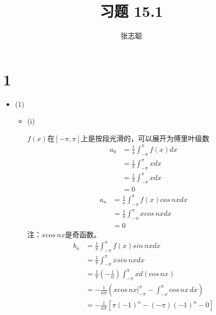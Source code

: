 \documentclass{article}
\begin{document}
\title{习题 15.1}
\author{张志聪}
\maketitle

\section*{1}
\begin{itemize}
  \item (1)

        \begin{itemize}
          \item (i)

                $f(x)$在$[-\pi, \pi]$上是按段光滑的，可以展开为傅里叶级数
                \begin{align*}
                  a_0
                   & = \frac{1}{\pi} \int_{-\pi}^{\pi} f(x) dx \\
                   & = \frac{1}{\pi} \int_{-\pi}^{\pi} x dx    \\
                   & = \frac{1}{\pi} \int_{-\pi}^{\pi} x dx    \\
                   & = 0
                \end{align*}
                \begin{align*}
                  a_n
                   & = \frac{1}{\pi} \int_{-\pi}^{\pi} f(x) cos\, nx dx \\
                   & = \frac{1}{\pi} \int_{-\pi}^{\pi} x cos\, nx dx    \\
                   & = 0
                \end{align*}
                注：$x cos\, nx$是奇函数。
                \begin{align*}
                  b_n
                   & = \frac{1}{\pi} \int_{-\pi}^{\pi} f(x) sin\, nx dx                                   \\
                   & = \frac{1}{\pi} \int_{-\pi}^{\pi} x sin\, nx dx                                      \\
                   & = \frac{1}{\pi} (-\frac{1}{n})\int_{-\pi}^{\pi} x d(cos\, nx)                        \\
                   & = -\frac{1}{n\pi}(x cos\, nx \bigg|_{-\pi}^{\pi} - \int_{-\pi}^{\pi} cos\, nx \, dx) \\
                   & = -\frac{1}{n\pi}[\pi(-1)^n - (-\pi)(-1)^n - 0]                                      \\

\end{align*}
\end{itemize}
\end{itemize}
\end{document}
